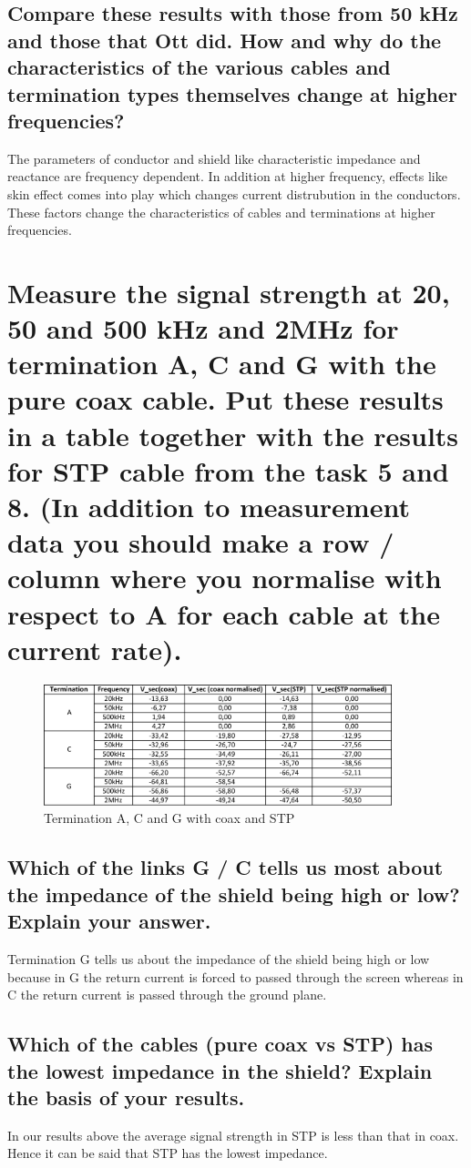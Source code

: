 \documentclass[12pt,a4paper,UKenglish]{article}
\begin{document}
\subsection{Compare these results with those from 50 kHz and those that Ott did. How and why do the characteristics of the various cables and termination types themselves change at higher frequencies?}
The parameters of conductor and shield like characteristic impedance and reactance are frequency dependent. In addition at higher frequency, effects like skin effect comes into play which changes current distrubution in the conductors. These factors change the characteristics of cables and terminations at higher frequencies.

\section{Measure the signal strength at 20, 50 and 500 kHz and 2MHz for termination A, C and G with the pure coax cable. Put these results in a table together with the results for STP cable from the task 5 and 8. (In addition to measurement data you should make a row / column where you normalise with respect to A for each cable at the current rate).}
\begin{figure} [H] %
  \centering 
  \includegraphics[width=0.9\textwidth]{img/task9_data.pdf} 
  \caption{Termination A, C and G with coax and STP}
  \label{fig:task9} 
\end{figure}

\subsection{Which of the links G / C tells us most about the impedance of the shield being high or low? Explain your answer.}
Termination G tells us about the impedance of the shield being high or low because in G the return current is forced to passed through the screen whereas in C the return current is passed through the ground plane.

\subsection{Which of the cables (pure coax vs STP) has the lowest impedance in the shield? Explain the basis of your results.}
In our results above the average signal strength in STP is less than that in coax. Hence it can be said that STP has the lowest impedance.
\end{document}
